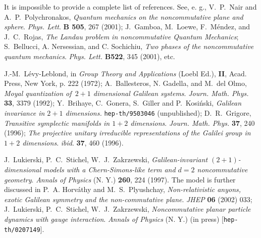 \documentclass[a4paper,11pt]{article}
\begin{document}
\begin{thebibliography}{99}
It is impossible to provide a complete list of references.
See, e. g.,
V.~P.~Nair and A.~P.~Polychronakos,
{\it Quantum mechanics on the noncommutative plane and sphere}.
{\sl  Phys. Lett}. {\bf B 505}, 267 (2001);
J.~Gamboa, M.~Loewe, F.~M\'endez, and J.~C.~Rojas,
{\it The Landau problem in noncommutative Quantum Mechanics};
  S.~Bellucci, A. Nersessian, and C. Sochichiu,
{\it Two phases of the noncommutative quantum mechanics}.
{\sl Phys. Lett.} {\bf B522}, 345 (2001), etc.

J.-M.~L\'evy-Leblond,
in {\it Group Theory and Applications} (Loebl Ed.),
{\bf II}, Acad. Press, New York, p. 222 (1972);
A.~Ballesteros, N. Gadella, and M.~del Olmo,
{\it Moyal quantization of\ $2+1$ dimensional
   Galilean systems}.
  {\sl Journ. Math. Phys.} {\bf 33}, 3379 (1992);
Y.~Brihaye, C.~Gonera, S.~Giller and P.~Kosi\'nski,
  {\it Galilean invariance in $2+1$ dimensions.}
\texttt {hep-th/9503046} (unpublished);
D.~R.~Grigore,
  {\it Transitive symplectic manifolds in $1+2$ dimensions}.
  {\sl Journ. Math. Phys.} {\bf 37}, 240 (1996);
   {\it The projective unitary irreducible representations of the
  Galilei group in $1+2$ dimensions}. {\sl ibid}. {\bf 37}, 460 (1996).

J.~Lukierski, P.~C.~Stichel, W.~J.~Zakrzewski,
   {\it Galilean-invariant $(2+1)$-dimensional models with a
     Chern-Simons-like term and $d=2$ noncommutative geometry}.
  {\sl Annals of Physics}  (N. Y.) {\bf 260}, 224 (1997).
The model is further discussed in
P.~A. Horv\'athy and M.~S.~Plyushchay,
{\it Non-relativistic anyons, exotic Galilean symmetry and the
non-commutative plane}.
{\sl JHEP} {\bf 06} (2002) 033; %
  J.~Lukierski, P.~C.~Stichel, W.~J.~Zakrzewski,
   {\it Noncommutative planar particle dynamics
   with gauge interaction}.
  {\sl Annals of Physics}  (N. Y.) (in press)
[\texttt{hep-th/0207149}].


\end{thebibliography}
\end{document}
